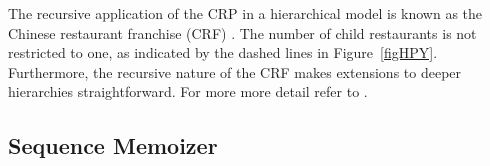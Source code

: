 %
%
The recursive application of the CRP in a hierarchical model is known as the Chinese restaurant franchise (CRF) \cite{Teh2006b}.  The number of child restaurants is not restricted to one, as indicated by the dashed lines in Figure~\ref{figHPY}.  Furthermore, the recursive nature of the CRF makes extensions to deeper hierarchies straightforward. For more more detail refer to \cite{Teh2006b, Teh2006a}.

\subsection{Sequence Memoizer}
\label{sec:sm}

